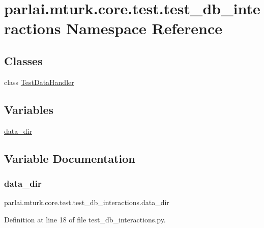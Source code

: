 \hypertarget{namespaceparlai_1_1mturk_1_1core_1_1test_1_1test__db__interactions}{}\section{parlai.\+mturk.\+core.\+test.\+test\+\_\+db\+\_\+interactions Namespace Reference}
\label{namespaceparlai_1_1mturk_1_1core_1_1test_1_1test__db__interactions}
\subsection*{Classes}
\begin{DoxyCompactItemize}
\item 
class \hyperlink{classparlai_1_1mturk_1_1core_1_1test_1_1test__db__interactions_1_1TestDataHandler}{Test\+Data\+Handler}
\end{DoxyCompactItemize}
\subsection*{Variables}
\begin{DoxyCompactItemize}
\item 
\hyperlink{namespaceparlai_1_1mturk_1_1core_1_1test_1_1test__db__interactions_a033da2ef81c936c9d2864de258bacca9}{data\+\_\+dir}
\end{DoxyCompactItemize}


\subsection{Variable Documentation}
\mbox{\label{namespaceparlai_1_1mturk_1_1core_1_1test_1_1test__db__interactions_a033da2ef81c936c9d2864de258bacca9}} 
\subsubsection{\texorpdfstring{data\+\_\+dir}{data\_dir}}
{\footnotesize\ttfamily parlai.\+mturk.\+core.\+test.\+test\+\_\+db\+\_\+interactions.\+data\+\_\+dir}



Definition at line 18 of file test\+\_\+db\+\_\+interactions.\+py.


